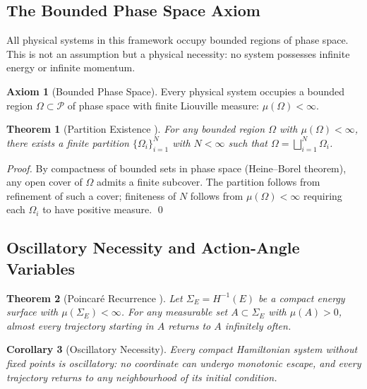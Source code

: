 \documentclass[twocolumn,10pt,a4paper]{article}
\theoremstyle{thmstyle}
\newtheorem{theorem}{Theorem}[section]
\newtheorem{corollary}[theorem]{Corollary}
\theoremstyle{definition}
\newtheorem{axiom}{Axiom}
\theoremstyle{remark}
\begin{document}
\subsection{The Bounded Phase Space Axiom}

All physical systems in this framework occupy bounded regions of phase
space. This is not an assumption but a physical necessity: no system
possesses infinite energy or infinite momentum.

\begin{axiom}[Bounded Phase Space]
\label{ax:bounded}
Every physical system occupies a bounded region $\Omega \subset
\mathcal{P}$ of phase space with finite Liouville measure:
$\mu(\Omega) < \infty$.
\end{axiom}

\begin{theorem}[Partition Existence \citealp{arnold1989methods}]
\label{thm:partition-existence}
For any bounded region $\Omega$ with $\mu(\Omega) < \infty$, there
exists a finite partition $\{\Omega_i\}_{i=1}^N$ with $N < \infty$
such that $\Omega = \bigsqcup_{i=1}^N \Omega_i$.
\end{theorem}

\begin{proof}
By compactness of bounded sets in phase space (Heine--Borel theorem),
any open cover of $\Omega$ admits a finite subcover. The partition
follows from refinement of such a cover; finiteness of $N$ follows
from $\mu(\Omega) < \infty$ requiring each $\Omega_i$ to have positive
measure. \qed
\end{proof}

\subsection{Oscillatory Necessity and Action-Angle Variables}

\begin{theorem}[Poincar\'e Recurrence \citealp{poincare1890trois}]
\label{thm:poincare}
Let $\Sigma_E = H^{-1}(E)$ be a compact energy surface with
$\mu(\Sigma_E) < \infty$. For any measurable set $A \subset \Sigma_E$
with $\mu(A) > 0$, almost every trajectory starting in $A$ returns to
$A$ infinitely often.
\end{theorem}

\begin{corollary}[Oscillatory Necessity]
\label{cor:oscillatory}
Every compact Hamiltonian system without fixed points is oscillatory:
no coordinate can undergo monotonic escape, and every trajectory returns
to any neighbourhood of its initial condition.
\end{corollary}
\end{document}
